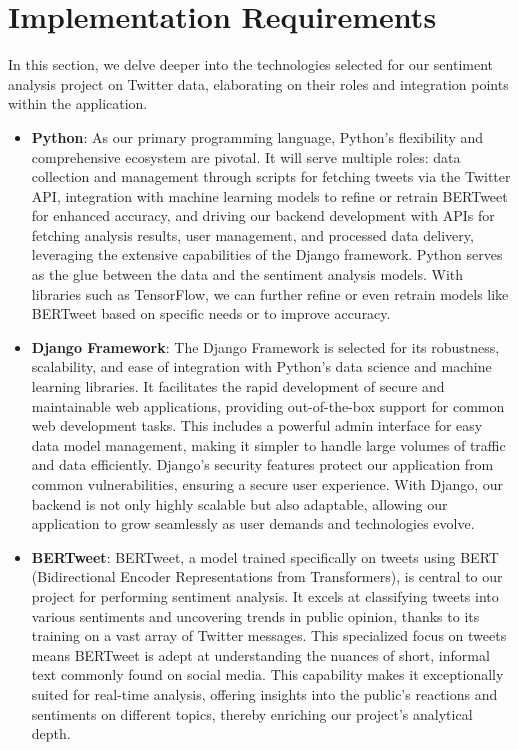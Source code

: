 \documentclass[conference]{IEEEtran}
\begin{document}
\section{Implementation Requirements}
In this section, we delve deeper into the technologies selected for our sentiment analysis project on Twitter data, elaborating on their roles and integration points within the application.

\begin{itemize}
    \item \textbf{Python}: As our primary programming language, Python's flexibility and comprehensive ecosystem are pivotal. It will serve multiple roles: data collection and management through scripts for fetching tweets via the Twitter API, integration with machine learning models to refine or retrain BERTweet for enhanced accuracy, and driving our backend development with APIs for fetching analysis results, user management, and processed data delivery, leveraging the extensive capabilities of the Django framework. Python serves as the glue between the data and the sentiment analysis models. With libraries such as TensorFlow, we can further refine or even retrain models like BERTweet based on specific needs or to improve accuracy.
    
    \item \textbf{Django Framework}: The Django Framework is selected for its robustness, scalability, and ease of integration with Python's data science and machine learning libraries. It facilitates the rapid development of secure and maintainable web applications, providing out-of-the-box support for common web development tasks. This includes a powerful admin interface for easy data model management, making it simpler to handle large volumes of traffic and data efficiently. Django's security features protect our application from common vulnerabilities, ensuring a secure user experience. With Django, our backend is not only highly scalable but also adaptable, allowing our application to grow seamlessly as user demands and technologies evolve.
    
    \item \textbf{BERTweet}: BERTweet, a model trained specifically on tweets using BERT (Bidirectional Encoder Representations from Transformers), is central to our project for performing sentiment analysis. It excels at classifying tweets into various sentiments and uncovering trends in public opinion, thanks to its training on a vast array of Twitter messages. This specialized focus on tweets means BERTweet is adept at understanding the nuances of short, informal text commonly found on social media. This capability makes it exceptionally suited for real-time analysis, offering insights into the public's reactions and sentiments on different topics, thereby enriching our project's analytical depth.


\end{itemize}
\end{document}
